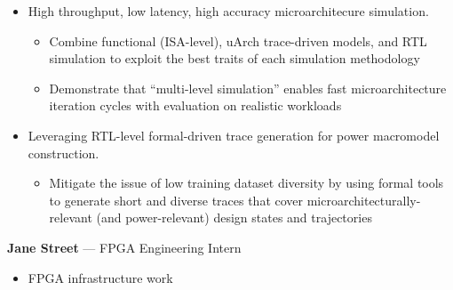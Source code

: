\documentclass[10pt]{article}
\begin{document}
\begin{itemize}
\begin{itemize}
    \end{itemize}
    \item High throughput, low latency, high accuracy microarchitecure simulation.
    \begin{itemize}
        \item Combine functional (ISA-level), uArch trace-driven models, and RTL simulation to exploit the best traits of each simulation methodology
        \item Demonstrate that ``multi-level simulation'' enables fast microarchitecture iteration cycles with evaluation on realistic workloads
    \end{itemize}
    \item Leveraging RTL-level formal-driven trace generation for power macromodel construction.
    \begin{itemize}
        \item Mitigate the issue of low training dataset diversity by using formal tools to generate short and diverse traces that cover microarchitecturally-relevant (and power-relevant) design states and trajectories
    \end{itemize}
\end{itemize}
\vspace{0.2cm}

 \textbf{Jane Street} --- FPGA Engineering Intern
\begin{itemize}
    \item FPGA infrastructure work
\end{itemize}
\vspace{0.2cm}
\end{document}
